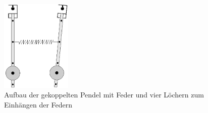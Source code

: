 \begin{figure}
\centering
\includegraphics[width=0.3\textwidth]{Bilder/Versuch2.eps}
\caption{Aufbau der gekoppelten Pendel mit Feder und vier Löchern zum Einhängen der Federn}
\label{fig:gekoppelt}
\end{figure}